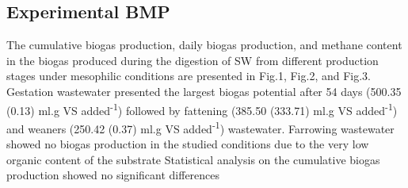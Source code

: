 \subsection{Experimental BMP}
The cumulative biogas production, daily biogas production, and methane content in the biogas produced during the digestion of SW from different production stages under mesophilic conditions are presented in Fig.1, Fig.2, and Fig.3. Gestation wastewater presented the largest biogas potential after 54 days (500.35 (0.13) ml.g VS added\textsuperscript{-1}) followed by fattening (385.50 (333.71) ml.g VS added\textsuperscript{-1}) and weaners (250.42 (0.37) ml.g VS added\textsuperscript{-1}) wastewater. Farrowing wastewater showed no biogas production in the studied conditions due to the very low organic content of the substrate Statistical analysis on the cumulative biogas production showed no significant differences